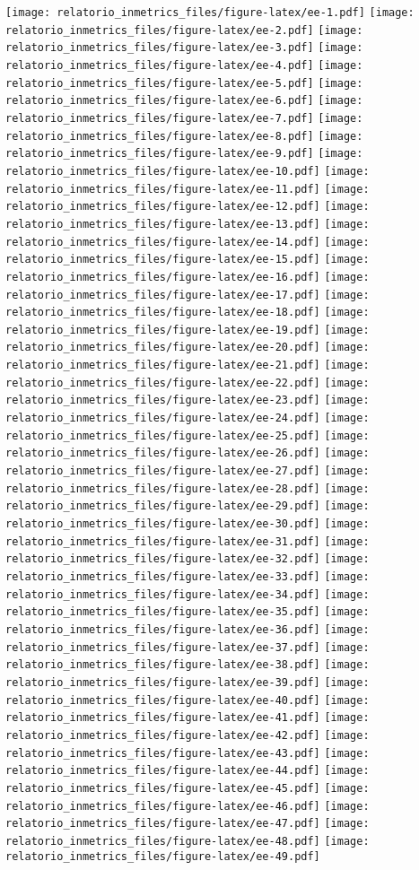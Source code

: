 \documentclass[]{book}
\begin{document}
\texttt{[image: relatorio\_inmetrics\_files/figure-latex/ee-1.pdf]} \texttt{[image: relatorio\_inmetrics\_files/figure-latex/ee-2.pdf]} \texttt{[image: relatorio\_inmetrics\_files/figure-latex/ee-3.pdf]} \texttt{[image: relatorio\_inmetrics\_files/figure-latex/ee-4.pdf]} \texttt{[image: relatorio\_inmetrics\_files/figure-latex/ee-5.pdf]} \texttt{[image: relatorio\_inmetrics\_files/figure-latex/ee-6.pdf]} \texttt{[image: relatorio\_inmetrics\_files/figure-latex/ee-7.pdf]} \texttt{[image: relatorio\_inmetrics\_files/figure-latex/ee-8.pdf]} \texttt{[image: relatorio\_inmetrics\_files/figure-latex/ee-9.pdf]} \texttt{[image: relatorio\_inmetrics\_files/figure-latex/ee-10.pdf]} \texttt{[image: relatorio\_inmetrics\_files/figure-latex/ee-11.pdf]} \texttt{[image: relatorio\_inmetrics\_files/figure-latex/ee-12.pdf]} \texttt{[image: relatorio\_inmetrics\_files/figure-latex/ee-13.pdf]} \texttt{[image: relatorio\_inmetrics\_files/figure-latex/ee-14.pdf]} \texttt{[image: relatorio\_inmetrics\_files/figure-latex/ee-15.pdf]} \texttt{[image: relatorio\_inmetrics\_files/figure-latex/ee-16.pdf]} \texttt{[image: relatorio\_inmetrics\_files/figure-latex/ee-17.pdf]} \texttt{[image: relatorio\_inmetrics\_files/figure-latex/ee-18.pdf]} \texttt{[image: relatorio\_inmetrics\_files/figure-latex/ee-19.pdf]} \texttt{[image: relatorio\_inmetrics\_files/figure-latex/ee-20.pdf]} \texttt{[image: relatorio\_inmetrics\_files/figure-latex/ee-21.pdf]} \texttt{[image: relatorio\_inmetrics\_files/figure-latex/ee-22.pdf]} \texttt{[image: relatorio\_inmetrics\_files/figure-latex/ee-23.pdf]} \texttt{[image: relatorio\_inmetrics\_files/figure-latex/ee-24.pdf]} \texttt{[image: relatorio\_inmetrics\_files/figure-latex/ee-25.pdf]} \texttt{[image: relatorio\_inmetrics\_files/figure-latex/ee-26.pdf]} \texttt{[image: relatorio\_inmetrics\_files/figure-latex/ee-27.pdf]} \texttt{[image: relatorio\_inmetrics\_files/figure-latex/ee-28.pdf]} \texttt{[image: relatorio\_inmetrics\_files/figure-latex/ee-29.pdf]} \texttt{[image: relatorio\_inmetrics\_files/figure-latex/ee-30.pdf]} \texttt{[image: relatorio\_inmetrics\_files/figure-latex/ee-31.pdf]} \texttt{[image: relatorio\_inmetrics\_files/figure-latex/ee-32.pdf]} \texttt{[image: relatorio\_inmetrics\_files/figure-latex/ee-33.pdf]} \texttt{[image: relatorio\_inmetrics\_files/figure-latex/ee-34.pdf]} \texttt{[image: relatorio\_inmetrics\_files/figure-latex/ee-35.pdf]} \texttt{[image: relatorio\_inmetrics\_files/figure-latex/ee-36.pdf]} \texttt{[image: relatorio\_inmetrics\_files/figure-latex/ee-37.pdf]} \texttt{[image: relatorio\_inmetrics\_files/figure-latex/ee-38.pdf]} \texttt{[image: relatorio\_inmetrics\_files/figure-latex/ee-39.pdf]} \texttt{[image: relatorio\_inmetrics\_files/figure-latex/ee-40.pdf]} \texttt{[image: relatorio\_inmetrics\_files/figure-latex/ee-41.pdf]} \texttt{[image: relatorio\_inmetrics\_files/figure-latex/ee-42.pdf]} \texttt{[image: relatorio\_inmetrics\_files/figure-latex/ee-43.pdf]} \texttt{[image: relatorio\_inmetrics\_files/figure-latex/ee-44.pdf]} \texttt{[image: relatorio\_inmetrics\_files/figure-latex/ee-45.pdf]} \texttt{[image: relatorio\_inmetrics\_files/figure-latex/ee-46.pdf]} \texttt{[image: relatorio\_inmetrics\_files/figure-latex/ee-47.pdf]} \texttt{[image: relatorio\_inmetrics\_files/figure-latex/ee-48.pdf]} \texttt{[image: relatorio\_inmetrics\_files/figure-latex/ee-49.pdf]} 
\end{document}
